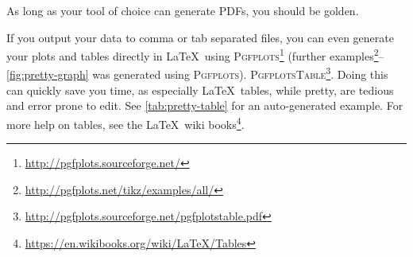 As long as your tool of choice can generate PDFs, you should be golden.

If you output your data to comma or tab separated files, you can even
generate your plots and tables directly in \LaTeX\ using
\textsc{Pgfplots}\footnote{\url{http://pgfplots.sourceforge.net/}}
   (further examples\footnote{\url{http://pgfplots.net/tikz/examples/all/}}--\autoref{fig:pretty-graph} was generated using \textsc{Pgfplots}).
\textsc{PgfplotsTable}\footnote{\url{http://pgfplots.sourceforge.net/pgfplotstable.pdf}}.
Doing this can quickly save you time, as especially \LaTeX\ tables, while
pretty, are tedious and error prone to edit. See
\autoref{tab:pretty-table} for an auto-generated example. For more help on
tables, see the \LaTeX\ wiki books\footnote{\url{https://en.wikibooks.org/wiki/LaTeX/Tables}}.


